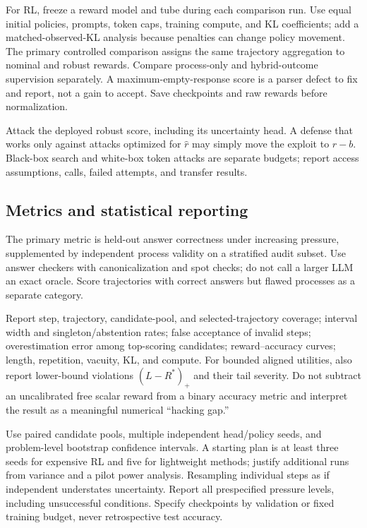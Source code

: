 For RL, freeze a reward model and tube during each comparison run. Use equal
initial policies, prompts, token caps, training compute, and KL coefficients;
add a matched-observed-KL analysis because penalties can change policy movement.
The primary controlled comparison assigns the same trajectory aggregation to
nominal and robust rewards. Compare process-only and hybrid-outcome supervision
separately. A maximum-empty-response score is a parser defect to fix and report,
not a gain to accept. Save checkpoints and raw rewards before normalization.

Attack the deployed robust score, including its uncertainty head. A defense that
works only against attacks optimized for $\hat r$ may simply move the exploit to
$\hat r-b$. Black-box search and white-box token attacks are separate budgets;
report access assumptions, calls, failed attempts, and transfer results.

\subsection{Metrics and statistical reporting}
The primary metric is held-out answer correctness under increasing pressure,
supplemented by independent process validity on a stratified audit subset.
Use answer checkers with canonicalization and spot checks; do not call a larger
LLM an exact oracle. Score trajectories with correct answers but flawed processes
as a separate category.

Report step, trajectory, candidate-pool, and selected-trajectory coverage;
interval width and singleton/abstention rates; false acceptance of invalid steps;
overestimation error among top-scoring candidates; reward--accuracy curves; length,
repetition, vacuity, KL, and compute. For bounded aligned utilities, also report
lower-bound violations $(L-R^*)_+$ and their tail severity. Do not subtract an
uncalibrated free scalar reward from a binary accuracy metric and interpret the
result as a meaningful numerical ``hacking gap.''

Use paired candidate pools, multiple independent head/policy seeds, and
problem-level bootstrap confidence intervals. A starting plan is at least three
seeds for expensive RL and five for lightweight methods; justify additional runs
from variance and a pilot power analysis. Resampling individual steps as if
independent understates uncertainty. Report all prespecified pressure levels,
including unsuccessful conditions. Specify checkpoints by validation or fixed
training budget, never retrospective test accuracy.

